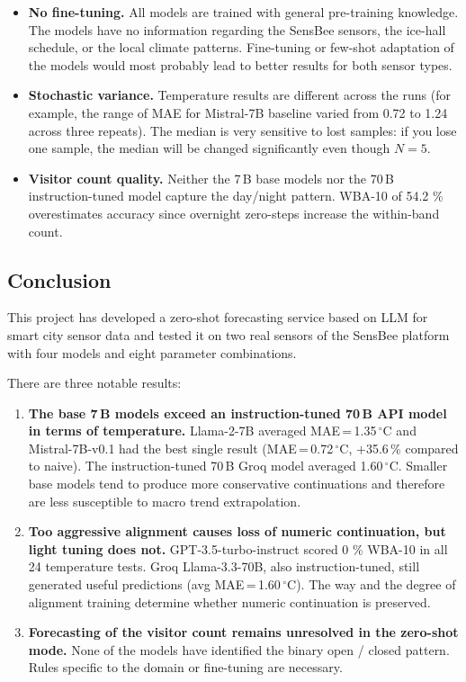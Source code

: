 \documentclass[11pt,a4paper]{article}
\begin{document}
\begin{itemize}[leftmargin=*]
  \item \textbf{No fine-tuning.} All models are trained with general pre-training knowledge. The models have no information regarding the SensBee sensors, the ice-hall schedule, or the local climate patterns. Fine-tuning or few-shot adaptation of the models would most probably lead to better results for both sensor types.

  \item \textbf{Stochastic variance.} Temperature results are different across the runs (for example, the range of MAE for Mistral-7B baseline varied from 0.72 to 1.24 across three repeats). The median is very sensitive to lost samples: if you lose one sample, the median will be changed significantly even though $N = 5$.
  
  \item \textbf{Visitor count quality.} Neither the 7\,B base models nor the 70\,B instruction-tuned model capture the day/night pattern. WBA-10 of 54.2 \% overestimates accuracy since overnight zero-steps increase the within-band count. 
  
\end{itemize}

\subsection{Conclusion}

This project has developed a zero-shot forecasting service based on LLM for smart city sensor data and tested it on two real sensors of the SensBee platform with four models and eight parameter combinations.

There are three notable results:

\begin{enumerate}[leftmargin=*]
    \item \textbf{The base 7\,B models exceed an instruction-tuned 70\,B API model in terms of temperature.}
    Llama-2-7B averaged MAE\,=\,1.35\,$^{\circ}$C and Mistral-7B-v0.1 had the best single result (MAE\,=\,0.72\,$^{\circ}$C, $+$35.6\,\% compared to naive).
    The instruction-tuned 70\,B Groq model averaged 1.60\,$^{\circ}$C.
    Smaller base models tend to produce more conservative continuations and therefore are less susceptible to macro trend extrapolation.
    
    \item \textbf{Too aggressive alignment causes loss of numeric continuation, but light tuning does not.}
    GPT-3.5-turbo-instruct scored 0 \% WBA-10 in all 24 temperature tests. Groq Llama-3.3-70B, also instruction-tuned, still generated useful predictions (avg MAE\,=\,1.60\,$^{\circ}$C). The way and the degree of alignment training determine whether numeric continuation is preserved.
    
    \item \textbf{Forecasting of the visitor count remains unresolved in the zero-shot mode.}
    None of the models have identified the binary open / closed pattern. Rules specific to the domain or fine-tuning are necessary.
\end{enumerate}
 
\end{document}
